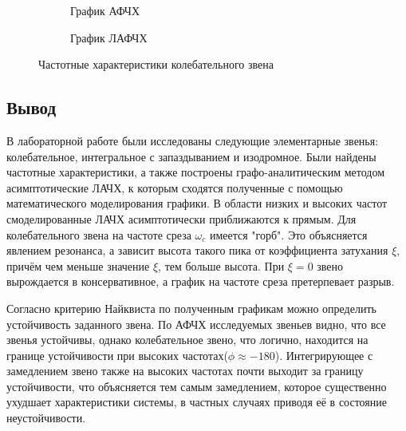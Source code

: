 \documentclass[a4paper, 11pt]{article}
\begin{document}
\begin{figure}[h!]
    \begin{subfigure}{0.5\textwidth}
        \centering
        \caption{График АФЧХ}
    \end{subfigure}
    \begin{subfigure}{0.5\textwidth}
        \centering
        \caption{График ЛАФЧХ}
    \end{subfigure}
    \caption{Частотные характеристики колебательного звена}
\end{figure}

\newpage
\begin{center}
	\section*{Вывод}
\end{center}
\par 
В лабораторной работе были исследованы следующие элементарные звенья: колебательное, интегральное с запаздыванием и изодромное. Были найдены частотные характеристики, а также построены графо-аналитическим методом асимптотические ЛАЧХ, к которым сходятся полученные с помощью математического моделирования графики. В области низких и высоких частот смоделированные ЛАЧХ асимптотически приближаются к прямым.	Для колебательного звена на частоте среза $\omega_c$ имеется "горб". Это объясняется явлением резонанса, а зависит высота такого пика от коэффициента затухания $\xi$, причём чем меньше значение $\xi$, тем больше высота. При $\xi=0$ звено вырождается в консервативное, а график на частоте среза претерпевает разрыв.
\par 
Согласно критерию Найквиста по полученным графикам можно определить устойчивость заданного звена. По АФЧХ исследуемых звеньев видно, что все звенья устойчивы, однако колебательное звено, что логично, находится на границе устойчивости при высоких частотах($\phi\approx-180$). Интегрирующее с замедлением звено также на высоких частотах почти выходит за границу устойчивости, что объясняется тем самым замедлением, которое существенно ухудшает характеристики системы, в частных случаях приводя её в состояние неустойчивости.
\end{document}
